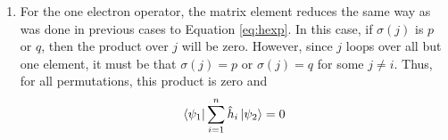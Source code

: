 \documentclass[final,3p,times,twocolumn]{elsarticle}
\begin{document}
\begin{enumerate}
	\item For the one electron operator, the matrix element reduces the same way as was done in previous cases to Equation \eqref{eq:hexp}.
	In this case, if $\sigma(j)$ is $p$ or $q$, then the product over $j$ will be zero. However, since $j$ loops over all but one element, it must be that $\sigma(j) = p$ or $\sigma(j)=q$ for some $j\neq i$. Thus, for all permutations, this product is zero and
	\begin{equation}
	\bra{\psi_1}\sum_{i=1}^n \hat h_i \ket{\psi_2} = 0
	\end{equation}
	

\end{enumerate}
\end{document}
